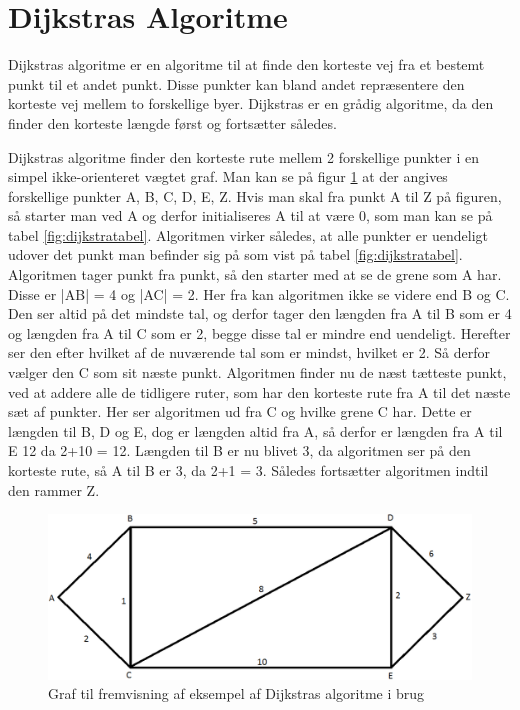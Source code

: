 \section{Dijkstras Algoritme}

Dijkstras algoritme er en algoritme til at finde den korteste vej fra et bestemt punkt til et andet punkt. Disse punkter kan bland andet repræsentere den korteste vej mellem to forskellige byer. Dijkstras er en grådig algoritme, da den finder den korteste længde først og fortsætter således.\cite{DMATBOGEN}

\vspace{5mm}

Dijkstras algoritme finder den korteste rute mellem 2 forskellige punkter i en simpel ikke-orienteret vægtet graf. Man kan se på figur \ref{fig:dijkstrasgraf} at der angives forskellige punkter {A, B, C, D, E, Z}. Hvis man skal fra punkt A til Z på figuren, så starter man ved A og derfor initialiseres A til at være 0, som man kan se på tabel \ref{fig:dijkstratabel}. Algoritmen virker således, at alle punkter er uendeligt udover det punkt man befinder sig på som vist på tabel \ref{fig:dijkstratabel}. Algoritmen tager punkt fra punkt, så den starter med at se de grene som A har. Disse er |AB| = 4 og |AC| = 2. Her fra kan algoritmen ikke se videre end B og C. Den ser altid på det mindste tal, og derfor tager den længden fra A til B som er 4 og længden fra A til C som er 2, begge disse tal er mindre end uendeligt. Herefter ser den efter hvilket af de nuværende tal som er mindst, hvilket er 2. Så derfor vælger den C som sit næste punkt. Algoritmen finder nu de næst tætteste punkt, ved at addere alle de tidligere ruter, som har den korteste rute fra A til det næste sæt af punkter. Her ser algoritmen ud fra C og hvilke grene C har. Dette er længden til B, D og E, dog er længden altid fra A, så derfor er længden fra A til E 12 da 2+10 = 12. Længden til B er nu blivet 3, da algoritmen ser på den korteste rute, så A til B er 3, da 2+1 = 3. Således fortsætter algoritmen indtil den rammer Z.\cite{DMATBOGEN}

\begin{figure}[ht!]
\begin{adjustbox}{width=1.2\textwidth,center=\textwidth}
\centering
\includegraphics[width=1.2\textwidth]{Pictures/Teoriafsnit/Figurfiler/dijkstrasgraf.png}
\end{adjustbox}
\label{fig:dijkstrasgraf}
\caption{Graf til fremvisning af eksempel af Dijkstras algoritme i brug}
\end{figure}

